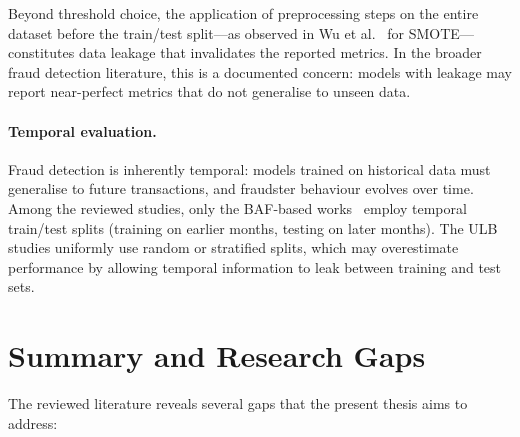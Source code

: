 Beyond threshold choice, the application of preprocessing steps on the entire dataset before the train/test split---as observed in Wu et al.~\cite{wu2025ccnn} for SMOTE---constitutes data leakage that invalidates the reported metrics. In the broader fraud detection literature, this is a documented concern: models with leakage may report near-perfect metrics that do not generalise to unseen data.

\paragraph{Temporal evaluation.}
Fraud detection is inherently temporal: models trained on historical data must generalise to future transactions, and fraudster behaviour evolves over time. Among the reviewed studies, only the BAF-based works~\cite{jesus2022turning, alves2025benchmarking} employ temporal train/test splits (training on earlier months, testing on later months). The ULB studies uniformly use random or stratified splits, which may overestimate performance by allowing temporal information to leak between training and test sets.


\section{Summary and Research Gaps}
\label{sec:rw_gaps}

The reviewed literature reveals several gaps that the present thesis aims to address:

